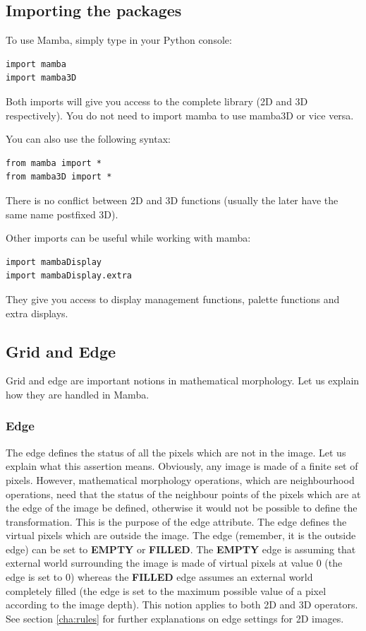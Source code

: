 \documentclass[a4paper,10pt,oneside]{article}
\begin{document}
\subsection{Importing the packages}

To use Mamba, simply type in your Python console:

\lstset{language=Python}
\begin{lstlisting}
import mamba
import mamba3D
\end{lstlisting}

Both imports will give you access to the complete library (2D and 3D respectively).
You do not need to import mamba to use mamba3D or vice versa.

You can also use the following syntax:

\lstset{language=Python}
\begin{lstlisting}
from mamba import *
from mamba3D import *
\end{lstlisting}

There is no conflict between 2D and 3D functions (usually the later have the
same name postfixed 3D).

Other imports can be useful while working with mamba:

\lstset{language=Python}
\begin{lstlisting}
import mambaDisplay
import mambaDisplay.extra
\end{lstlisting}

They give you access to display management functions, palette functions and
extra displays.

\subsection{Grid and Edge}

Grid and edge are important notions in mathematical morphology. Let us explain
how they are handled in Mamba. 

\subsubsection{Edge}

The edge defines the status of all the pixels which are not in the image. Let us 
explain what this assertion means. Obviously, any image is made of a finite set 
of pixels. However, mathematical morphology operations, which are neighbourhood 
operations, need that the status of the neighbour points of the pixels which are at 
the edge of the image be defined, otherwise it would not be possible to define the 
transformation. This is the purpose of the edge attribute. The edge defines the 
virtual pixels which are outside the image. The edge (remember, it is the outside 
edge) can be set to \textbf{EMPTY} or \textbf{FILLED}. The \textbf{EMPTY} edge
is assuming that external world surrounding 
the image is made of virtual pixels at value 0 (the edge is set to 0) whereas 
the \textbf{FILLED} edge assumes an external world completely filled 
(the edge is set to the maximum possible value of a pixel according to the image 
depth). This notion applies to both 2D and 3D operators. See section \ref{cha:rules} for
further explanations on edge settings for 2D images.
\end{document}
